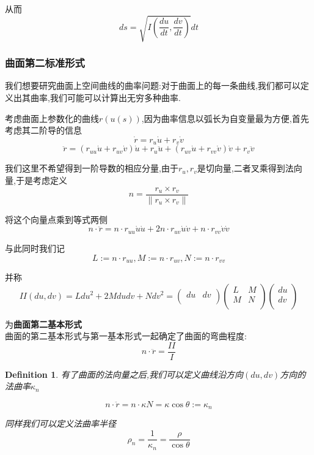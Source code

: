 \documentclass[11pt,hyperref,a4paper,UTF8]{ctexart}
\newtheorem{definition}{Definition}[subsection]
\newcommand{\parameter}[1]{\left(#1\right)}
\begin{document}
\begin{CJK}{UTF8}{gkai}
从而
\[ds = \sqrt{I\parameter{\frac{du}{dt},\frac{dv}{dt}}} dt\]

\subsubsection{曲面第二标准形式}
我们想要研究曲面上空间曲线的曲率问题:对于曲面上的每一条曲线,我们都可以定义出其曲率,我们可能可以计算出无穷多种曲率.

考虑曲面上参数化的曲线$r(u(s))$,因为曲率信息以弧长为自变量最为方便,首先考虑其二阶导的信息
\[\dot{r} = r_u \dot{u} + r_v \dot{v}\]
\[\ddot{r} =  (r_{uu} \dot{u} + r_{uv} \dot{v}) \dot{u} + r_u \ddot{u} + (r_{uv} \dot{u} + r_{vv} \dot{v}) \dot{v} + r_v \ddot{v}\]

我们这里不希望得到一阶导数的相应分量,由于$r_u,r_v$是切向量,二者叉乘得到法向量,于是考虑定义
\[n = \frac{r_u \times r_v}{\|r_u \times r_v\|}\]

将这个向量点乘到等式两侧
\[n \cdot \ddot{r} = n \cdot r_{uu} \dot{u} \dot{u} + 2 n \cdot r_{uv} \dot{u} \dot{v} + n \cdot r_{vv} \dot{v} \dot{v}\]

与此同时我们记
\[L := n \cdot r_{uu}, M:= n \cdot r_{uv}, N:= n \cdot r_{vv}\]

并称
\[II(du,dv) = L du^2 + 2 M du dv + N dv^2 = \begin{pmatrix}
  du & dv\\
\end{pmatrix}
\begin{pmatrix}
  L & M\\
  M & N\\
\end{pmatrix}
\begin{pmatrix}
  du\\
  dv\\
\end{pmatrix}\]

为\textbf{曲面第二基本形式}\\


曲面的第二基本形式与第一基本形式一起确定了曲面的弯曲程度:
\[n \cdot \ddot{r} = \frac{II}{I}\]

\begin{definition}
  
有了曲面的法向量之后,我们可以定义曲线沿方向$(du,dv)$方向的法曲率$\kappa_n$

\[n\cdot \ddot{r} = n \cdot \kappa N = \kappa \cos \theta := \kappa_n\]

同样我们可以定义法曲率半径
\[\rho_n = \frac{1}{\kappa_n} = \frac{\rho}{\cos \theta}\]


\end{definition}
\end{CJK}
\end{document}
